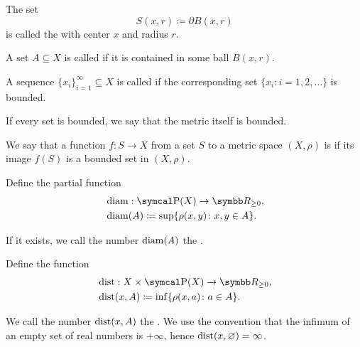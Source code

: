 \begin{definition}
\begin{defenum}
     The set
    \begin{equation*}
      S(x, r) \coloneqq \partial{B(x, r)}
    \end{equation*}
    is called the  with center \( x \) and radius \( r \).

     A set \( A \subseteq X \) is called  if it is contained in some ball \( B(x, r) \).

     A sequence \( \{ x_i \}_{i=1}^\infty \subseteq X \) is called  if the corresponding set \( \{ x_i \colon i = 1, 2, \ldots \} \) is bounded.

     If every set is bounded, we say that the metric itself is bounded.

     We say that a function \( f: S \to X \) from a set \( S \) to a metric space \( (X, \rho) \) is  if its image \( f(S) \) is a bounded set in \( (X, \rho) \).

     Define the partial function
    \begin{align*}
      &\Diam: \Power(X) \to \R_{\geq 0}, \\
      &\Diam(A) \coloneqq \sup \{ \rho(x, y) \colon x, y \in A \}.
    \end{align*}

    If it exists, we call the number \( \operatorname{diam}(A) \) the .

     Define the function
    \begin{align*}
      &\Dist: X \times \Power(X) \to \R_{\geq 0}, \\
      &\Dist(x, A) \coloneqq \inf \{ \rho(x, a) \colon a \in A \}.
    \end{align*}

    We call the number \( \operatorname{dist}(x, A) \) the . We use the convention that the infimum of an empty set of real numbers is \( +\infty \), hence \( \operatorname{dist}(x, \varnothing) = \infty \).
  \end{defenum}
\end{definition}

